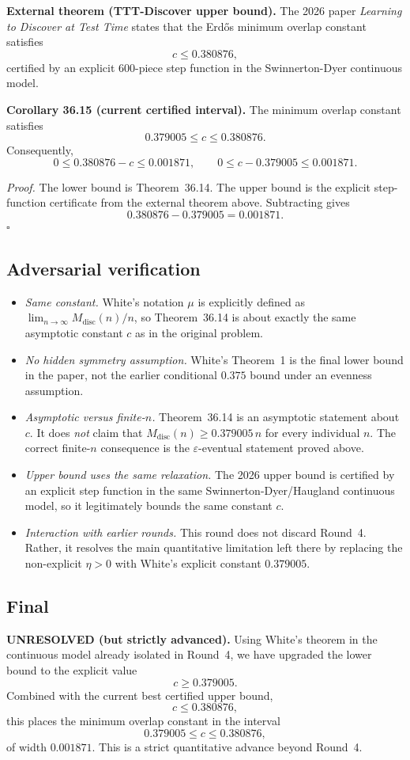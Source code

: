 \medskip
\noindent\textbf{External theorem (TTT-Discover upper bound).}
The 2026 paper \emph{Learning to Discover at Test Time} states that the Erd\H{o}s minimum overlap constant satisfies
\[
 c\le 0.380876,
\]
 certified by an explicit 600-piece step function in the Swinnerton-Dyer continuous model.

\medskip
\noindent\textbf{Corollary 36.15 (current certified interval).}
The minimum overlap constant satisfies
\[
 0.379005\le c\le 0.380876.
\]
Consequently,
\[
 0\le 0.380876-c\le 0.001871,
\qquad
 0\le c-0.379005\le 0.001871.
\]

\noindent\emph{Proof.}
The lower bound is Theorem~36.14.
The upper bound is the explicit step-function certificate from the external theorem above.
Subtracting gives
\[
0.380876-0.379005=0.001871.
\]
\hfill$\square$

\subsection{Adversarial verification}
\begin{itemize}
\item \emph{Same constant.} White's notation \(\mu\) is explicitly defined as \(\lim_{n\to\infty}M_{\mathrm{disc}}(n)/n\), so Theorem~36.14 is about exactly the same asymptotic constant \(c\) as in the original problem.
\item \emph{No hidden symmetry assumption.} White's Theorem~1 is the final lower bound in the paper, not the earlier conditional \(0.375\) bound under an evenness assumption.
\item \emph{Asymptotic versus finite-\(n\).} Theorem~36.14 is an asymptotic statement about \(c\). It does \emph{not} claim that \(M_{\mathrm{disc}}(n)\ge 0.379005\,n\) for every individual \(n\). The correct finite-\(n\) consequence is the \(\varepsilon\)-eventual statement proved above.
\item \emph{Upper bound uses the same relaxation.} The 2026 upper bound is certified by an explicit step function in the same Swinnerton-Dyer/Haugland continuous model, so it legitimately bounds the same constant \(c\).
\item \emph{Interaction with earlier rounds.} This round does not discard Round~4. Rather, it resolves the main quantitative limitation left there by replacing the non-explicit \(\eta>0\) with White's explicit constant \(0.379005\).
\end{itemize}

\subsection{Final}
\textbf{UNRESOLVED (but strictly advanced).}
Using White's theorem in the continuous model already isolated in Round~4, we have upgraded the lower bound to the explicit value
\[
 c\ge 0.379005.
\]
Combined with the current best certified upper bound,
\[
 c\le 0.380876,
\]
this places the minimum overlap constant in the interval
\[
 0.379005\le c\le 0.380876,
\]
of width \(0.001871\).
This is a strict quantitative advance beyond Round~4.

